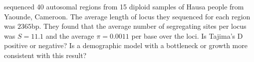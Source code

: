 \begin{question}
\citet{voight2005interrogating} sequenced 40 autosomal regions from 15 diploid samples of Hausa people from Yaounde, Cameroon. The average length of locus they sequenced for each region was $2365$bp. They found that the average number of segregating sites per locus was $S= 11.1$ and the average $\pi = 0.0011$ per base over the loci. Is Tajima's D positive or negative? Is a demographic model with a bottleneck or growth more consistent with this result?
\end{question}


